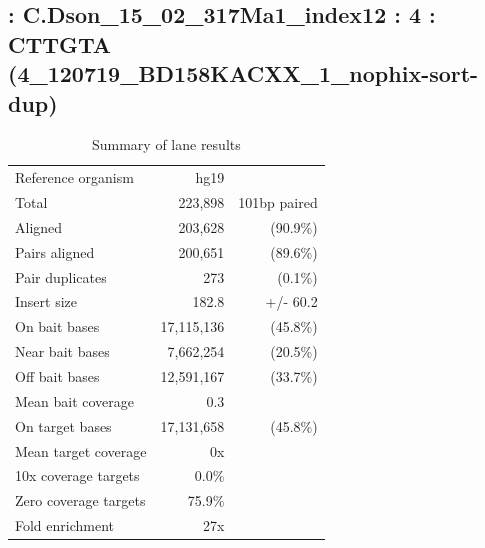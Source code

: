 \documentclass{article}
\begin{document}
    
\subsection*{ : C.Dson\_15\_02\_317Ma1\_index12 : 4 : CTTGTA (4\_120719\_BD158KACXX\_1\_nophix-sort-dup)}

    \begin{table}[h]
    \centering
    \begin{tabular}{|l|rr|}
    \hline
            Reference organism & hg19 &  \\ 
            Total & 223,898 & 101bp paired \\ 
            Aligned & 203,628 & (90.9\%) \\ 
            Pairs aligned & 200,651 & (89.6\%) \\ 
            Pair duplicates & 273 & (0.1\%) \\ 
            Insert size & 182.8 & +/- 60.2 \\ 
            \hline
            On bait bases & 17,115,136 & (45.8\%) \\ 
            Near bait bases & 7,662,254 & (20.5\%) \\ 
            Off bait bases & 12,591,167 & (33.7\%) \\ 
            Mean bait coverage & 0.3 &  \\ 
            On target bases & 17,131,658 & (45.8\%) \\ 
            Mean target coverage & 0x &  \\ 
            10x coverage targets & 0.0\% &  \\ 
            Zero coverage targets & 75.9\% &  \\ 
            Fold enrichment & 27x &  \\ 
    \hline
    \end{tabular}
    \caption{Summary of lane results}
    \end{table}
\end{document}
